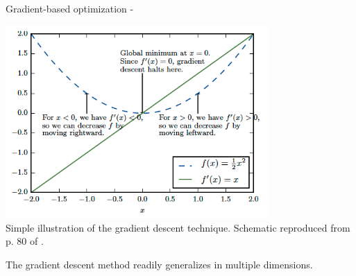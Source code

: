 \begin{frame}[t,allowframebreaks]{Gradient-based optimization -}
    \framebreak


    \begin{center}
        \includegraphics[width=0.75\textwidth]
            {./images/grad_descent/goodfellow17_grad_descent_1d.png}\\
        {\tiny 
            Simple illustration of the gradient descent technique.
            \color{col:attribution} 
            Schematic reproduced from p. 80 of \cite{Goodfellow:2017MITDL}.\\
        }
    \end{center}        

    \framebreak


    The \gls{gradient descent} method
    readily generalizes in multiple dimensions.\\



\end{frame}
